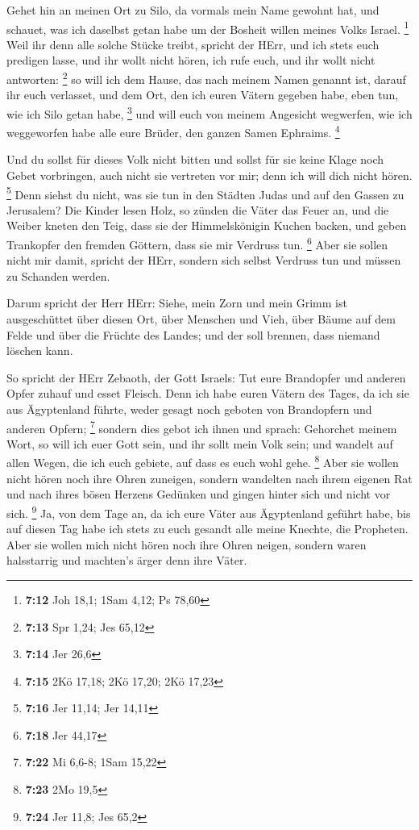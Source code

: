 Gehet hin an meinen Ort zu Silo, da vormals mein Name
gewohnt hat, und schauet, was ich daselbst getan habe um der Bosheit
willen meines Volks Israel. \footnote{\textbf{7:12} Joh 18,1; 1Sam 4,12;
  Ps 78,60}  Weil ihr denn alle solche Stücke treibt,
spricht der HErr, und ich stets euch predigen lasse, und ihr wollt nicht
hören, ich rufe euch, und ihr wollt nicht antworten: \footnote{\textbf{7:13}
  Spr 1,24; Jes 65,12}  so will ich dem Hause, das nach
meinem Namen genannt ist, darauf ihr euch verlasset, und dem Ort, den
ich euren Vätern gegeben habe, eben tun, wie ich Silo getan habe,
\footnote{\textbf{7:14} Jer 26,6}  und will euch von meinem
Angesicht wegwerfen, wie ich weggeworfen habe alle eure Brüder, den
ganzen Samen Ephraims. \footnote{\textbf{7:15} 2Kö 17,18; 2Kö 17,20; 2Kö
  17,23}

 Und du sollst für dieses Volk nicht bitten und sollst für
sie keine Klage noch Gebet vorbringen, auch nicht sie vertreten vor mir;
denn ich will dich nicht hören. \footnote{\textbf{7:16} Jer 11,14; Jer
  14,11}  Denn siehst du nicht, was sie tun in den Städten
Judas und auf den Gassen zu Jerusalem?  Die Kinder lesen
Holz, so zünden die Väter das Feuer an, und die Weiber kneten den Teig,
dass sie der Himmelskönigin Kuchen backen, und geben Trankopfer den
fremden Göttern, dass sie mir Verdruss tun. \footnote{\textbf{7:18} Jer
  44,17}  Aber sie sollen nicht mir damit, spricht der
HErr, sondern sich selbst Verdruss tun und müssen zu Schanden werden.

 Darum spricht der Herr HErr: Siehe, mein Zorn und mein
Grimm ist ausgeschüttet über diesen Ort, über Menschen und Vieh, über
Bäume auf dem Felde und über die Früchte des Landes; und der soll
brennen, dass niemand löschen kann.

 So spricht der HErr Zebaoth, der Gott Israels: Tut eure
Brandopfer und anderen Opfer zuhauf und esset Fleisch. 
Denn ich habe euren Vätern des Tages, da ich sie aus Ägyptenland führte,
weder gesagt noch geboten von Brandopfern und anderen Opfern;
\footnote{\textbf{7:22} Mi 6,6-8; 1Sam 15,22}  sondern dies
gebot ich ihnen und sprach: Gehorchet meinem Wort, so will ich euer Gott
sein, und ihr sollt mein Volk sein; und wandelt auf allen Wegen, die ich
euch gebiete, auf dass es euch wohl gehe. \footnote{\textbf{7:23} 2Mo
  19,5}  Aber sie wollen nicht hören noch ihre Ohren
zuneigen, sondern wandelten nach ihrem eigenen Rat und nach ihres bösen
Herzens Gedünken und gingen hinter sich und nicht vor sich. \footnote{\textbf{7:24}
  Jer 11,8; Jes 65,2}  Ja, von dem Tage an, da ich eure
Väter aus Ägyptenland geführt habe, bis auf diesen Tag habe ich stets zu
euch gesandt alle meine Knechte, die Propheten.  Aber sie
wollen mich nicht hören noch ihre Ohren neigen, sondern waren
halsstarrig und machten's ärger denn ihre Väter.

